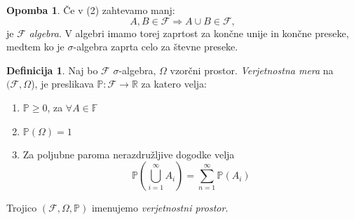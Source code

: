 \documentclass[11pt]{article}
\theoremstyle{definition}
\newtheorem{definicija}{Definicija}[section]
\theoremstyle{definition}
\theoremstyle{definition}
\newtheorem*{opomba}{Opomba}
\begin{document}
\begin{opomba}

Če v (2) zahtevamo manj:
$$A, B \in \mathcal{F} \Rightarrow A \cup B \in \mathcal{F},$$
je $\mathcal{F}$ \textit{algebra}. V algebri imamo torej zaprtost za končne unije in končne preseke, medtem ko je $\sigma$-algebra zaprta celo za števne preseke.

\end{opomba}
\vspace{0.5cm}

\begin{definicija}
Naj bo $\mathcal{F}$ $\sigma$-algebra, $\Omega$ vzorčni prostor. \textit{Verjetnostna mera} na $(\mathcal{F}, \Omega$), je preslikava $\mathbb{P}: \mathcal{F} \rightarrow \mathbb{R}$ za katero velja:
\begin{enumerate}
	\item $\mathbb{P} \geq 0$, za $\forall A \in \mathbb{F}$
	\item $\mathbb{P}(\Omega) = 1$
	\item Za poljubne paroma nerazdružljive dogodke velja
	$$\mathbb{P}\left( \bigcup_{i=1}^{\infty} A_i \right) = \sum_{n=1}^{\infty} \mathbb{P}(A_i)$$
\end{enumerate}
Trojico $(\mathcal{F}, \Omega, \mathbb{P})$ imenujemo \textit{verjetnostni prostor}.
\end{definicija}
\vspace{0.5cm}
\end{document}
